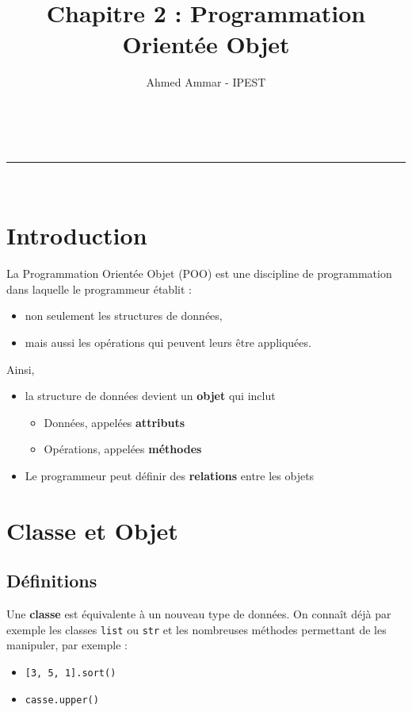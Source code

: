 \documentclass[a4paper,11pt]{article}
\author{Ahmed Ammar - IPEST}
\makeatletter
\newcommand{\linia}{\rule{\linewidth}{0.5pt}}
\theoremstyle{mytheor}
\renewcommand{\maketitle}{
\begin{center}
\vspace{2ex}
{\huge \textsc{\@title}}
\vspace{1ex}
\\
\linia\\
\@author \hfill \@date
\vspace{4ex}
\end{center}
}
\makeatother
\begin{document}
\lstset{language=python} %

\title{Chapitre 2 : Programmation Orientée Objet}

\maketitle
\vspace{1cm}


\tableofcontents


\vspace{1cm} %
\clearpage

\section{Introduction}
La Programmation Orientée Objet (POO) est une discipline de programmation dans laquelle le programmeur établit :
\begin{itemize}
	\item non seulement les structures de données,
	
	\item mais aussi les opérations qui peuvent leurs être appliquées.
\end{itemize}

\noindent
Ainsi,
\begin{itemize}
	\item la structure de données devient un \textbf{objet} qui inclut
	\begin{itemize}
		
		\item Données, appelées \textbf{attributs}
		
		\item Opérations, appelées \textbf{méthodes}
		
	\end{itemize}
	
	\noindent
	\item Le programmeur peut définir des \textbf{relations} entre les objets
\end{itemize}

\noindent
\section{Classe et Objet}
\subsection{Définitions}
Une \textbf{classe} est équivalente à un nouveau type de données. On connaît déjà par exemple les classes \texttt{list} ou \texttt{str} et les nombreuses méthodes permettant de les manipuler, par exemple :
\begin{itemize}
	\item \texttt{[3, 5, 1].sort()}
	
	\item \texttt{casse.upper()}
\end{itemize}
\end{document}

